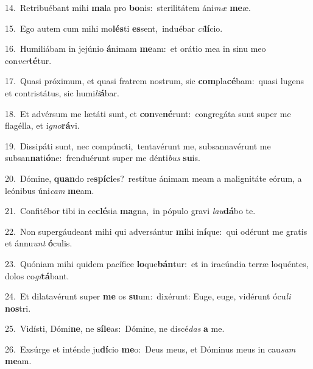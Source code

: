 {\numbfont\textcolor{\numbcolor}{14.}}~Retribuébant mihi \textbf{ma}\-la pro \textbf{bo}\-nis:~\star sterilitátem áni\textit{mæ} \textbf{me}\-æ.\par
{\numbfont\textcolor{\numbcolor}{15.}}~Ego autem cum mihi mo\-\textbf{lés}\-ti \textbf{es}\-sent,~\star induébar \textit{ci}\-\textbf{lí}cio.\par
{\numbfont\textcolor{\numbcolor}{16.}}~Humiliábam in jejúnio \textbf{á}\-nimam \textbf{me}\-am:~\star et orátio mea in sinu meo con\-\textit{ver}\-\textbf{té}tur.\par
{\numbfont\textcolor{\numbcolor}{17.}}~Quasi próximum, et quasi fratrem nostrum, sic \textbf{com}\-pla\-\textbf{cé}\-bam:~\star quasi lugens et contristátus, sic humi\-\textit{li}\-\textbf{á}bar.\par
{\numbfont\textcolor{\numbcolor}{18.}}~Et advérsum me lætáti sunt, et \textbf{con}\-ve\-\textbf{né}\-runt:~\star congregáta sunt super me flagélla, et i\-\textit{gno}\-\textbf{rá}vi.\par
{\numbfont\textcolor{\numbcolor}{19.}}~Dissipáti sunt, nec compúncti,~\dagger tentavérunt me, subsannavérunt me subsan\-\textbf{na}\-ti\-\textbf{ó}\-ne:~\star frenduérunt super me dénti\textit{bus} \textbf{su}\-is.\par
{\numbfont\textcolor{\numbcolor}{20.}}~Dómine, \textbf{quan}\-do re\-\textbf{spí}\-\textbf{ci}es?~\star restítue ánimam meam a malignitáte eórum, a leónibus úni\textit{cam} \textbf{me}\-am.\par
{\numbfont\textcolor{\numbcolor}{21.}}~Confitébor tibi in ec\-\textbf{clé}\-sia \textbf{ma}\-gna,~\star in pópulo gravi \textit{lau}\-\textbf{dá}bo te.\par
{\numbfont\textcolor{\numbcolor}{22.}}~Non supergáudeant mihi qui adversántur \textbf{mi}\-hi in\-\textbf{í}\-que:~\star qui odérunt me gratis et ánnu\textit{unt} \textbf{ó}\-culis.\par
{\numbfont\textcolor{\numbcolor}{23.}}~Quóniam mihi quidem pacífice \textbf{lo}\-que\-\textbf{bán}\-tur:~\star et in iracúndia terræ loquéntes, dolos co\-\textit{gi}\-\textbf{tá}bant.\par
{\numbfont\textcolor{\numbcolor}{24.}}~Et dilatavérunt super \textbf{me} os \textbf{su}\-um:~\star dixérunt: Euge, euge, vidérunt ócu\textit{li} \textbf{nos}\-tri.\par
{\numbfont\textcolor{\numbcolor}{25.}}~Vidísti, Dómi\-\textbf{ne}\-, ne \textbf{sí}\-\textbf{le}as:~\star Dómine, ne discé\textit{das} \textbf{a} me.\par
{\numbfont\textcolor{\numbcolor}{26.}}~Exsúrge et inténde ju\-\textbf{dí}\-cio \textbf{me}\-o:~\star Deus meus, et Dóminus meus in cau\textit{sam} \textbf{me}\-am.\par
